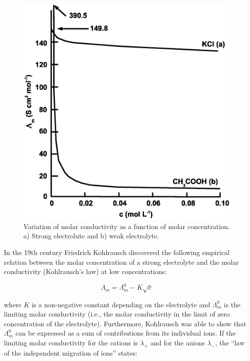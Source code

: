 \documentclass[byrevtex,amssymb,aps,pra,floatfix,letterpaper]{revtex4}
\begin{document}
\begin{figure}[!htp]
\begin{center}
\includegraphics[scale=0.3]{mcond}
\caption{Variation of molar conductivity as a function of molar concentration. a) Strong electrolute and b) weak electrolyte.}
\label{fig1}
\end{center}
\end{figure}

In the 19th century Friedrich Kohlrausch discovered the following empirical relation between the molar concentration of a strong electrolyte and the molar conductivity (Kohlrausch's law) at low concentrations:

\begin{equation}
\Lambda_m = \Lambda_m^0 - K\sqrt{c}
\label{eq5}
\end{equation}

\noindent
where $K$ is a non-negative constant depending on the electrolyte and $\Lambda_m^0$ is the limiting molar conductivity (i.e., the molar conductivity in the limit of zero concentration of the electrolyte). Furthermore, Kohlrausch was able to show that $\Lambda_m^0$ can be expressed as a sum of contributions from its individual ions. If the limiting molar conductivity for the cations is $\lambda_+$ and for the anions $\lambda_-$, the ``law of the independent migration of ions'' states:
\end{document}
